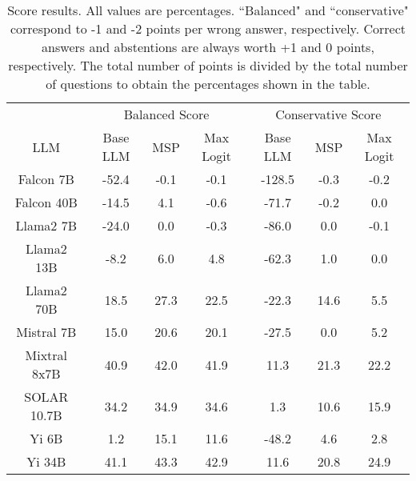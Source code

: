 \begin{table*}
\centering
\begin{tabular}{c|c|c|c|c|c|c}
& \multicolumn{3}{c|}{Balanced Score} & \multicolumn{3}{c}{Conservative Score} \\ 
LLM & Base LLM & MSP & Max Logit & Base LLM & MSP & Max Logit\\ \hline
Falcon 7B & -52.4 & -0.1 & -0.1 & -128.5 & -0.3 & -0.2\\
Falcon 40B & -14.5 & 4.1 & -0.6 & -71.7 & -0.2 & 0.0\\
Llama2 7B & -24.0 & 0.0 & -0.3 & -86.0 & 0.0 & -0.1\\
Llama2 13B & -8.2 & 6.0 & 4.8 & -62.3 & 1.0 & 0.0\\
Llama2 70B & 18.5 & 27.3 & 22.5 & -22.3 & 14.6 & 5.5\\
Mistral 7B & 15.0 & 20.6 & 20.1 & -27.5 & 0.0 & 5.2\\
Mixtral 8x7B & 40.9 & 42.0 & 41.9 & 11.3 & 21.3 & 22.2\\
SOLAR 10.7B & 34.2 & 34.9 & 34.6 & 1.3 & 10.6 & 15.9\\
Yi 6B & 1.2 & 15.1 & 11.6 & -48.2 & 4.6 & 2.8\\
Yi 34B & 41.1 & 43.3 & 42.9 & 11.6 & 20.8 & 24.9\\
\hline
\end{tabular}
\caption{Score results. All values are percentages. ``Balanced" and ``conservative" correspond to -1 and -2 points per wrong answer, respectively. Correct answers and abstentions are always worth +1 and 0 points, respectively. The total number of points is divided by the total number of questions to obtain the percentages shown in the table.}
\label{tab:score}
\end{table*}
